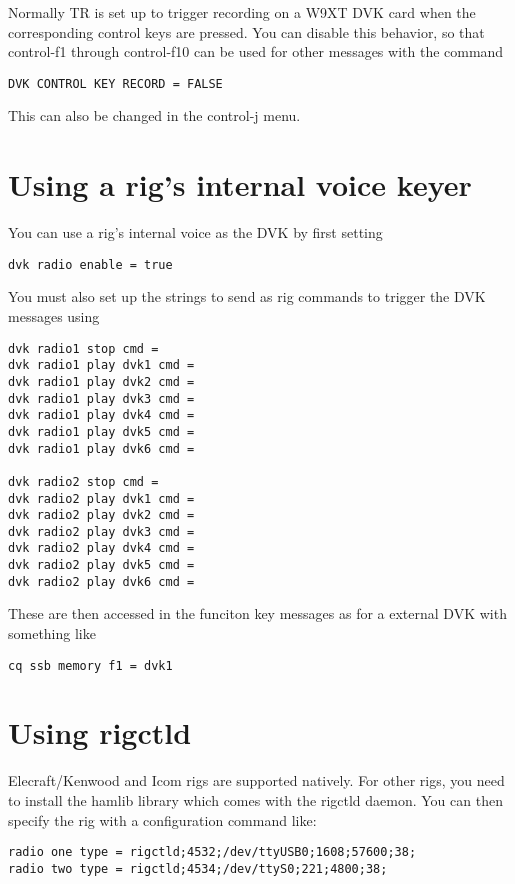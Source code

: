 \documentclass[12pt]{article}
\begin{document}
Normally TR is set up to trigger recording on a W9XT DVK card when the
corresponding control keys are pressed. You can disable this behavior,
so that control-f1 through control-f10 can be used for other messages
with the command
\begin{verbatim}
DVK CONTROL KEY RECORD = FALSE
\end{verbatim}
This can also be changed in the control-j menu.

\section{Using a rig's internal voice keyer}
You can use a rig's internal voice as the DVK by first setting
\begin{verbatim}
dvk radio enable = true
\end{verbatim}
You must also set up the strings to send as
rig commands to trigger the DVK messages using
\begin{verbatim}
dvk radio1 stop cmd =
dvk radio1 play dvk1 cmd =
dvk radio1 play dvk2 cmd =
dvk radio1 play dvk3 cmd =
dvk radio1 play dvk4 cmd =
dvk radio1 play dvk5 cmd =
dvk radio1 play dvk6 cmd =

dvk radio2 stop cmd =
dvk radio2 play dvk1 cmd =
dvk radio2 play dvk2 cmd =
dvk radio2 play dvk3 cmd =
dvk radio2 play dvk4 cmd =
dvk radio2 play dvk5 cmd =
dvk radio2 play dvk6 cmd =
\end{verbatim}
These are then accessed in the funciton key messages as for a external
DVK with something like
\begin{verbatim}
cq ssb memory f1 = dvk1
\end{verbatim}

\section{Using rigctld}
Elecraft/Kenwood and Icom rigs are supported natively. For other rigs,
you need to install the hamlib library which comes with the rigctld
daemon. You can then specify the rig with a configuration command like:
\begin{verbatim}
radio one type = rigctld;4532;/dev/ttyUSB0;1608;57600;38;
radio two type = rigctld;4534;/dev/ttyS0;221;4800;38;
\end{verbatim}
\end{document}
